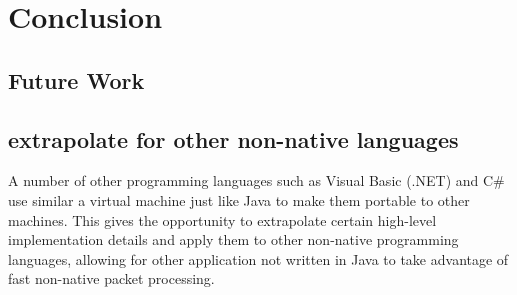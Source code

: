 \documentclass[final_report.tex]{subfiles}
\begin{document}
\section{Conclusion}
\label{sec:conclusion}



\subsection{Future Work}

\subsection{extrapolate for other non-native languages}
A number of other programming languages such as Visual Basic (.NET) and C\# use similar a virtual machine just like Java to make them portable to other machines. This gives the opportunity to extrapolate certain high-level implementation details and apply them to other non-native programming languages, allowing for other application not written in Java to take advantage of fast non-native packet processing. 
\end{document}

